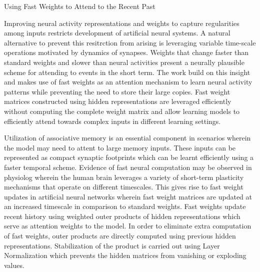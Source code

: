 \documentclass[11pt,letterpaper]{article}
\begin{document}
\begin{center}
  \large{Using Fast Weights to Attend to the Recent Past}
\end{center}

Improving neural activity representations and weights to capture regularities among inputs restricts development of artificial neural systems. A natural alternative to prevent this resitrction from arising is leveraging variable time-scale operations motivated by dynamics of synapses. Weights that change faster than standard weights and slower than neural activities present a neurally plausible scheme for attending to events in the short term. The work build on this insight and makes use of fast weights as an attention mechanism to learn neural activity patterns while preventing the need to store their large copies. Fast weight matrices constructed using hidden representations are leveraged efficiently without computing the complete weight matrix and allow learning models to efficiently attend towards complex inputs in different learning settings.

Utilization of associative memory is an essential component in scenarios wherein the model may need to attent to large memory inputs. These inputs can be represented as compact synaptic footprints which can be learnt efficiently using a faster temporal scheme. Evidence of fast neural computation may be observed in physiolog wherein the human brain leverages a variety of short-term plasticity mechanisms that operate on different timescales. This gives rise to fast weight updates in artificial neural networks wherein fast weight matrices are updated at an increased timescale in comparison to standard weights. Fast weights update recent history using weighted outer products of hidden representations which serve as attention weights to the model. In order to eliminate extra computation of fast weights, outer products are directly computed using previous hidden representations. Stabilization of the product is carried out using Layer Normalization which prevents the hidden matrices from vanishing or exploding values. 
\end{document}
